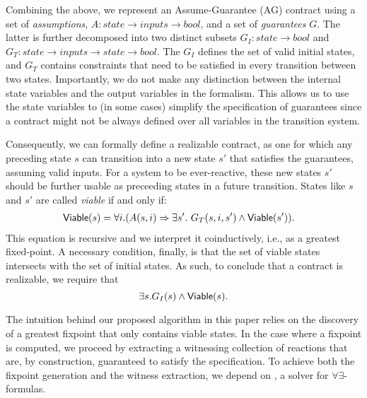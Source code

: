 Combining the above, we represent an Assume-Guarantee (AG) contract using a set
of \emph{assumptions}, $A: state \rightarrow inputs \rightarrow bool$,
and a set of \emph{guarantees} $G$. The latter is further decomposed into two
distinct subsets $G_I: state \rightarrow bool$ and $G_T: state \rightarrow
inputs \rightarrow state \rightarrow bool$. The $G_I$ defines the set of valid
initial states, and $G_T$ contains constraints that need to be satisfied in
every transition between two states. Importantly, we
do not make any distinction between the internal state variables and the output variables in the
formalism. This allows us to use the state variables to (in some cases)
simplify the specification of guarantees since a contract
might not be always defined over all variables in the transition system.

Consequently, we can formally define a realizable contract, as one for which any
preceding state $s$ can  transition into a new state $s'$ that satisfies
the guarantees, assuming valid inputs. For a system to be ever-reactive, these
new states $s'$ should be further usable as preceeding states in a future
transition. States like $s$ and $s'$ are called \textit{viable} if
and only if:
\begin{align}
\begin{split}
  {\mathsf {Viable}}(s) &=
  \forall i. (A(s, i) \Rightarrow \exists s'.~ G_T(s, i,s')
\land {\mathsf {Viable}}(s')).
\label{eq:viable}
\end{split}
\end{align}
This equation is recursive and we interpret it coinductively, i.e., as a
greatest fixed-point.
A necessary condition, finally, is that the set of viable states
intersects with the set of initial states. As such, to conclude that a contract
is realizable, we require that
\begin{equation}
\exists s. G_I(s) \land {\mathsf {Viable}}(s).
\label{eq:nonempty}
\end{equation}

The intuition behind our proposed algorithm in this paper relies on the
discovery of a greatest fixpoint that only contains viable states. In the case where a fixpoint is computed, we proceed by extracting a witnessing collection of reactions that are, by construction, guaranteed to satisfy the specification. To achieve both the fixpoint generation and the witness extraction, we depend on \aeval, a solver for $\forall\exists$-formulas.


